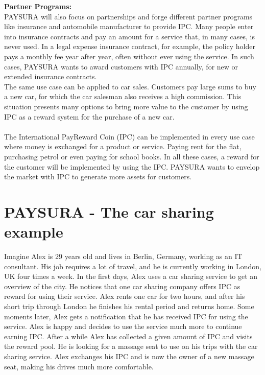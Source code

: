 \documentclass[twoside,onecolumn]{article}
\begin{document}
\textbf{Partner Programs:}\\
PAYSURA will also focus on partnerships and forge different partner programs like insurance and automobile manufacturer to provide IPC. Many people enter into insurance contracts and pay an amount for a service that, in many cases, is never used. In a legal expense insurance contract, for example, the policy holder pays a monthly fee year after year, often without ever using the service. In such cases, PAYSURA wants to award customers with IPC annually, for new or extended insurance contracts. \\
The same use case can be applied to car sales. Customers pay large sums to buy a new car, for which the car salesman also receives a high commission. This situation presents many options to bring more value to the customer by using IPC as a reward system for the purchase of a new car.\\
\\
The International PayReward Coin (IPC) can be implemented in every use case where money is exchanged for a product or service. Paying rent for the flat, purchasing petrol or even paying for school books. In all these cases, a reward for the customer will be implemented by using the IPC. PAYSURA wants to envelop the market with IPC to generate more assets for customers. 








\section{PAYSURA - The car sharing example} 
Imagine Alex is 29 years old and lives in Berlin, Germany, working as an IT consultant. His job requires a lot of travel, and he is currently working in London, UK four times a week. In the first days, Alex uses a car sharing service to get an overview of the city. He notices that one car sharing company offers IPC as reward for using their service. Alex rents one car for two hours, and after his short trip through London he finishes his rental period and returns home. Some moments later, Alex gets a notification that he has received IPC for using the service. Alex is happy and decides to use the service much more to continue earning IPC.	 After a while Alex has collected a given amount of IPC and visits the reward pool. He is looking for a massage seat to use on his trips with the car sharing service. Alex exchanges his IPC and is now the owner of a new massage seat, making his drives much more comfortable.
\end{document}
